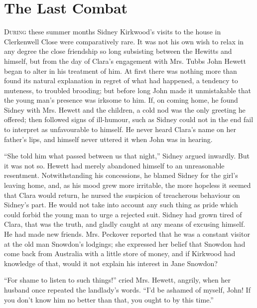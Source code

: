 \chapter{The Last Combat}

\textsc{During} these summer months Sidney Kirkwood's visits to the
house in Clerkenwell Close were comparatively rare. It was not his own
wish to relax in any degree the close friendship so long subsisting
between the Hewitts and himself, but from the day of Clara's engagement
with Mrs. Tubbs John Hewett began to alter in his treatment of him. At
first there was nothing more than found its natural explanation in
regret of what had happened, a tendency to muteness, to troubled
brooding; but before long John made it unmistakable that the young man's
presence was irksome to him. If, on coming home, he found Sidney with
Mrs. Hewett and the children, a cold nod was the only greeting he
offered; then followed signs of ill-humour,
{\protect\hypertarget{216}{}{}}such as Sidney could not in the end fail
to interpret as unfavourable to himself. He never heard Clara's name on
her father's lips, and himself never uttered it when John was in
hearing.

``She told him what passed between us that night,'' Sidney argued
inwardly. But it was not so. Hewett had merely abandoned himself to an
unreasonable resentment. Notwithstanding his concessions, he blamed
Sidney for the girl's leaving home, and, as his mood grew more
irritable, the more hopeless it seemed that Clara would return, he
nursed the suspicion of treacherous behaviour on Sidney's part. He would
not take into account any such thing as pride which could forbid the
young man to urge a rejected suit. Sidney had grown tired of Clara, that
was the truth, and gladly caught at any means of excusing himself. He
had made new friends. Mrs. Peckover reported that he was a constant
visitor at the old man Snowdon's lodgings; she expressed her belief that
Snowdon had come back from Australia with a little store
{\protect\hypertarget{217}{}{}}of money, and if Kirkwood had knowledge
of that, would it not explain his interest in Jane Snowdon?

``For shame to listen to such things!'' cried Mrs. Hewett, angrily, when
her husband once repeated the landlady's words. ``I'd be ashamed of
myself, John! If you don't know him no better than that, you ought to by
this time.''

